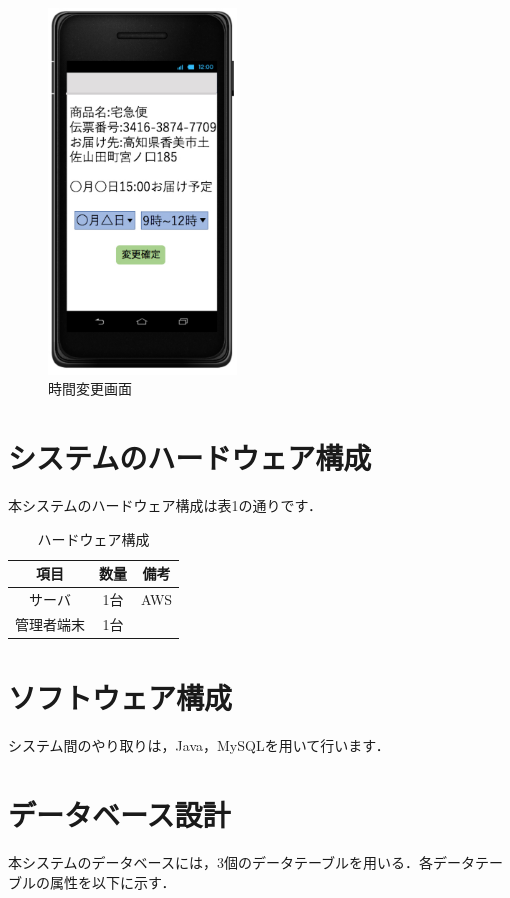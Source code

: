 \documentclass[a4j,titlepage]{jarticle}
\begin{document}
\begin{figure}[htbp]
 \begin{center}
  \includegraphics[width=50mm]{time_change}
	\caption{時間変更画面}
	\label{fig:time_change}
 \end{center}

\end{figure}

\section{システムのハードウェア構成}
本システムのハードウェア構成は表1の通りです．
\begin{table}[htbp]
\begin{center}
 \caption{ハードウェア構成}
  \begin{tabular}{|c|c|c|}\hline
    項目 & 数量 & 備考\\ \hline \hline
    サーバ & 1台 & AWS\\ \hline
    管理者端末 & 1台 & \\ \hline
  \end{tabular}
\end{center}
\end{table}


\section{ソフトウェア構成}
システム間のやり取りは，Java，MySQLを用いて行います．

\section{データベース設計}
本システムのデータベースには，3個のデータテーブルを用いる．各データテーブルの属性を以下に示す．
\end{document}
